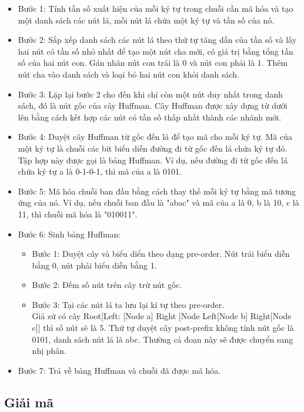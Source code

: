         \begin{itemize}
            \item Bước 1: Tính tần số xuất hiện của mỗi ký tự trong chuỗi cần mã hóa và tạo một danh sách các nút lá, mỗi nút lá chứa một ký tự và tần số của nó.
            \item Bước 2: Sắp xếp danh sách các nút lá theo thứ tự tăng dần của tần số và lấy hai nút có tần số nhỏ nhất để tạo một nút cha mới, có giá trị bằng tổng tần số của hai nút con. Gán nhãn nút con trái là 0 và nút con phải là 1. Thêm nút cha vào danh sách và loại bỏ hai nút con khỏi danh sách.
            \item Bước 3: Lặp lại bước 2 cho đến khi chỉ còn một nút duy nhất trong danh sách, đó là nút gốc của cây Huffman. Cây Huffman được xây dựng từ dưới lên bằng cách kết hợp các nút có tần số thấp nhất thành các nhánh mới.
            \item Bước 4: Duyệt cây Huffman từ gốc đến lá để tạo mã cho mỗi ký tự. Mã của một ký tự là chuỗi các bit biểu diễn đường đi từ gốc đến lá chứa ký tự đó. Tập hợp này được gọi là bảng Huffman. Ví dụ, nếu đường đi từ gốc đến lá chứa ký tự a là 0-1-0-1, thì mã của a là 0101.
            \item Bước 5: Mã hóa chuỗi ban đầu bằng cách thay thế mỗi ký tự bằng mã tương ứng của nó. Ví dụ, nếu chuỗi ban đầu là "abac" và mã của a là 0, b là 10, c là 11, thì chuỗi mã hóa là "010011".
            \item Bước 6: Sinh bảng Huffman:
                \begin{itemize}
                    \item Bước 1: Duyệt cây và biểu diển theo dạng pre-order. Nút trái biểu diễn bằng 0, nút phải biểu diễn bằng 1.
                    \item Bước 2: Đếm số nút trên cây trừ nút gốc.
                    \item Bước 3: Tại các nút lá ta lưu lại kí tự theo pre-order. \\
                    Giả sử có cây Root[Left: [Node a] Right [Node Left[Node b] Right[Node c]] thì số nút sẽ là 5. Thứ tự duyệt cây post-prefix không tính nút gốc là 0101, danh sách nút lá là abc. Thường cả đoạn này sẽ được chuyển sang nhị phân.
                \end{itemize}
            \item Bước 7: Trả về bảng Huffman và chuỗi đã được mã hóa.
        \end{itemize}

    \subsection{Giải mã}

